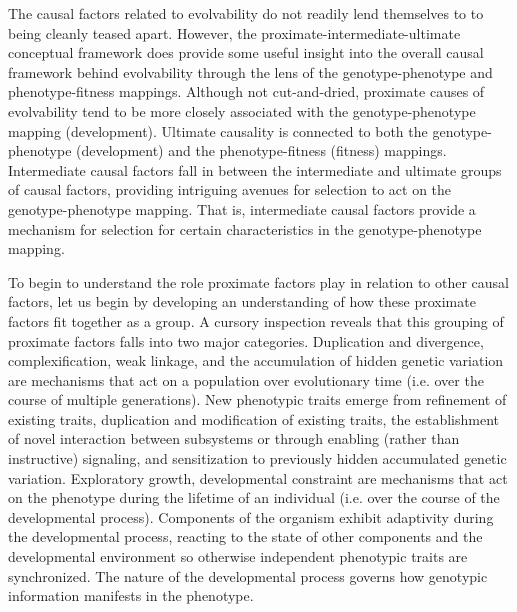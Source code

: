 The causal factors related to evolvability do not readily lend themselves to to being cleanly teased apart.
However, the proximate-intermediate-ultimate conceptual framework does provide some useful insight into the overall causal framework behind evolvability through the lens of the genotype-phenotype and phenotype-fitness mappings.
Although not cut-and-dried, proximate causes of evolvability tend to be more closely associated with the genotype-phenotype mapping (development).
Ultimate causality is connected to both the genotype-phenotype (development) and the phenotype-fitness (fitness) mappings.
Intermediate causal factors fall in between the intermediate and ultimate groups of causal factors, providing intriguing avenues for selection to act on the genotype-phenotype mapping. That is, intermediate causal factors provide a mechanism for selection for certain characteristics in the genotype-phenotype mapping.

To begin to understand the role proximate factors play in relation to other causal factors, let us begin by developing an understanding of how these proximate factors fit together as a group.
A cursory inspection reveals that this grouping of proximate factors falls into two major categories. 
Duplication and divergence, complexification, weak linkage, and the accumulation of hidden genetic variation are mechanisms that act on a population over evolutionary time (i.e. over the course of multiple generations).
New phenotypic traits emerge from refinement of existing traits, duplication and modification of existing traits, the establishment of novel interaction between subsystems or through enabling (rather than instructive) signaling, and sensitization to previously hidden accumulated genetic variation.
Exploratory growth, developmental constraint are mechanisms that act on the phenotype during the lifetime of an individual (i.e. over the course of the developmental process).
Components of the organism exhibit adaptivity during the developmental process, reacting to the state of other components and the developmental environment so otherwise independent phenotypic traits are synchronized.
The nature of the developmental process governs how genotypic information manifests in the phenotype.

